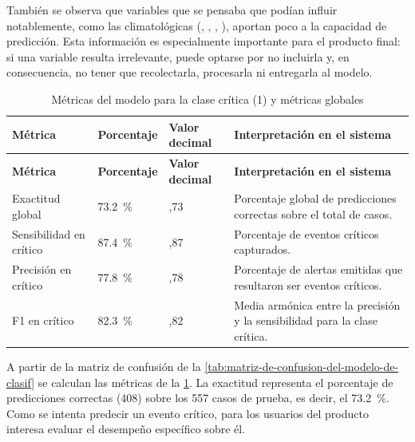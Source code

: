 También se observa que variables que se pensaba que podían influir notablemente, como las climatológicas (, , , ), aportan poco a la capacidad de predicción. Esta información es especialmente importante para el producto final: si una variable resulta irrelevante, puede optarse por no incluirla y, en consecuencia, no tener que recolectarla, procesarla ni entregarla al modelo.

\begin{longtable}[]{@{}
>{\raggedright\arraybackslash}p{}
  >{\centering\arraybackslash}p{}
  >{\centering\arraybackslash}p{}
  >{\raggedright\arraybackslash}p{}@{}}
\caption{Métricas del modelo para la clase crítica (1) y métricas globales}
\label{tab:metricas-del-modelo-de-clasificacion-par}\\
\toprule\noalign{}
\textbf{Métrica} & \textbf{Porcentaje} & \textbf{Valor decimal} & \textbf{Interpretación en el sistema} \\
\midrule\noalign{}
\endfirsthead
\toprule\noalign{}
\textbf{Métrica} & \textbf{Porcentaje} & \textbf{Valor decimal} & \textbf{Interpretación en el sistema} \\
\midrule\noalign{}
\endhead
\bottomrule\noalign{}
\endlastfoot
Exactitud global & \qty{73.2}{\percent} & 0,73 & Porcentaje global de predicciones correctas sobre el total de casos. \\
Sensibilidad en crítico & \qty{87.4}{\percent} & 0,87 & Porcentaje de eventos críticos capturados. \\
Precisión en crítico & \qty{77.8}{\percent} & 0,78 & Porcentaje de alertas emitidas que resultaron ser eventos críticos. \\
F1 en crítico & \qty{82.3}{\percent} & 0,82 & Media armónica entre la precisión y la sensibilidad para la clase crítica. \\
\end{longtable}


A partir de la matriz de confusión de la \cref{tab:matriz-de-confusion-del-modelo-de-clasif} se calculan las métricas de la \cref{tab:metricas-del-modelo-de-clasificacion-par}. La exactitud representa el porcentaje de predicciones correctas (408) sobre los 557 casos de prueba, es decir, el \qty{73.2}{\percent}. Como se intenta predecir un evento crítico, para los usuarios del producto interesa evaluar el desempeño específico sobre él.

